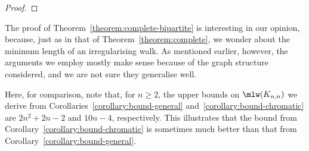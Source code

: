 \documentclass[a4paper,11pt,dvipsnames]{elsarticle}
\begin{document}
\begin{proof}
%
\end{proof}

The proof of Theorem~\ref{theorem:complete-bipartite} is interesting in our opinion, because, just as in that of Theorem~\ref{theorem:complete}, we wonder about the minimum length of an irregularising walk. As mentioned earlier, however, the arguments we employ mostly make sense because of the graph structure considered, and we are not sure they generalise well.

Here, for comparison, note that, for $n \geq 2$, the upper bounds on $\mlw(K_{n,n})$ we derive from Corollaries~\ref{corollary:bound-general} and~\ref{corollary:bound-chromatic} are $2n^2+2n-2$ and $10n-4$, respectively. This illustrates that the bound from Corollary~\ref{corollary:bound-chromatic} is sometimes much better than that from Corollary~\ref{corollary:bound-general}.




\end{document}
